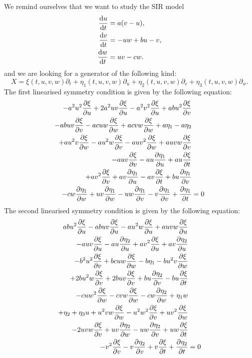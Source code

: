 We remind ourselves that we want to study the SIR model
\begin{equation*}
  \begin{split}
    \dv{u}{t}&=a(v-u),\\
    \dv{v}{t}&=-uw+bu-v,\\
    \dv{w}{t}&=uv-cw.
    \end{split}
  \end{equation*}
  and we are looking for a generator of the following kind:
\begin{equation}
X=\xi(t,u,v,w)\partial_t+\eta_1(t,u,v,w)\partial_u+\eta_2(t,u,v,w)\partial_v+\eta_3(t,u,v,w)\partial_w.
\end{equation}
The first linearised symmetry condition is given by the following equation:
\begin{align}
  - a^{2} u^{2} \pdv{\xi}{u} + 2 a^{2} u v \pdv{\xi}{u} - a^{2} v^{2} \pdv{\xi}{u} + a b u^{2} \pdv{\xi}{v}&\nonumber\\ - a b u v \pdv{\xi}{v} - a c u w \pdv{\xi}{w} + a c v w \pdv{\xi}{w} + a \eta_1 - a \eta_2&\nonumber\\
  + a u^{2} v \pdv{\xi}{w} - a u^{2} w \pdv{\xi}{v} - a u v^{2} \pdv{\xi}{w} + a u v w \pdv{\xi}{v}&\nonumber\\
  - a u v \pdv{\xi}{v} - a u \pdv{\eta_1}{u} + a u \pdv{\xi}{t} &\nonumber\\
  + a v^{2} \pdv{\xi}{v} + a v \pdv{\eta_1}{u} - a v \pdv{\xi}{t} + b u \pdv{\eta_1}{v}&\nonumber\\
  - c w \pdv{\eta_1}{w} + u v \pdv{\eta_1}{w} - u w \pdv{\eta_1}{v} - v \pdv{\eta_1}{v} + \pdv{\eta_1}{t}&=0\label{eq:Lorenz_lin_sym_1}
\end{align}
The second linearised symmetry condition is given by the following equation:
\begin{align}
  a b u^{2} \pdv{\xi}{u} - a b u v \pdv{\xi}{u} - a u^{2} w \pdv{\xi}{u} + a u v w \pdv{\xi}{u}&\nonumber\\
  - a u v \pdv{\xi}{u} - a u \pdv{\eta_2}{u} + a v^{2} \pdv{\xi}{u} + a v \pdv{\eta_2}{u}&\nonumber\\
  - b^{2} u^{2} \pdv{\xi}{v} + b c u w \pdv{\xi}{w} - b \eta_1 - b u^{2} v \pdv{\xi}{w}&\nonumber\\
  + 2 b u^{2} w \pdv{\xi}{v} + 2 b u v \pdv{\xi}{v} + b u \pdv{\eta_2}{v} - b u \pdv{\xi}{t}&\nonumber\\
  - c u w^{2} \pdv{\xi}{w} - c v w \pdv{\xi}{w} - c w \pdv{\eta_2}{w} + \eta_1 w &\nonumber\\
  + \eta_2 + \eta_3 u + u^{2} v w \pdv{\xi}{w} - u^{2} w^{2} \pdv{\xi}{v} + u v^{2} \pdv{\xi}{w}&\nonumber\\
  - 2 u v w \pdv{\xi}{v} + u v \pdv{\eta_2}{w} - u w \pdv{\eta_2}{v} + u w \pdv{\xi}{t} &\nonumber\\
  - v^{2} \pdv{\xi}{v} - v \pdv{\eta_2}{v} + v \pdv{\xi}{t} + \pdv{\eta_2}{t}&=0\label{eq:Lorenz_lin_sym_2}
\end{align}
